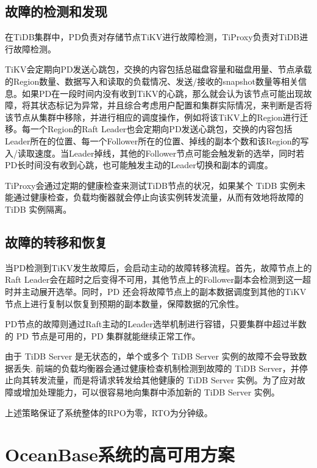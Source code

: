 \subsection{故障的检测和发现}

在TiDB集群中，PD负责对存储节点TiKV进行故障检测，TiProxy负责对TiDB进行故障检测。

TiKV会定期向PD发送心跳包，交换的内容包括总磁盘容量和磁盘用量、节点承载的Region数量、数据写入和读取的负载情况、发送/接收的snapshot数量等相关信息。如果PD在一段时间内没有收到TiKV的心跳，那么就会认为该节点可能出现故障，将其状态标记为异常，并且综合考虑用户配置和集群实际情况，来判断是否将该节点从集群中移除，并进行相应的调度操作，例如将该TiKV上的Region进行迁移。每一个Region的Raft Leader也会定期向PD发送心跳包，交换的内容包括Leader所在的位置、每一个Follower所在的位置、掉线的副本个数和该Region的写入/读取速度。当Leader掉线，其他的Follower节点可能会触发新的选举，同时若PD长时间没有收到心跳，也可能触发主动的Leader切换和副本的调度。


TiProxy会通过定期的健康检查来测试TiDB节点的状况，如果某个 TiDB 实例未能通过健康检查，负载均衡器就会停止向该实例转发流量，从而有效地将故障的 TiDB 实例隔离。



\subsection{故障的转移和恢复}

当PD检测到TiKV发生故障后，会启动主动的故障转移流程。首先，故障节点上的Raft Leader会在超时之后变得不可用，其他节点上的Follower副本会检测到这一超时并主动展开选举。同时，PD 还会将故障节点上的副本数据调度到其他的TiKV节点上进行复制以恢复到预期的副本数量，保障数据的冗余性。

PD节点的故障则通过Raft主动的Leader选举机制进行容错，只要集群中超过半数的 PD 节点是可用的，PD 集群就能继续正常工作。

由于 TiDB Server 是无状态的，单个或多个 TiDB Server 实例的故障不会导致数据丢失. 前端的负载均衡器会通过健康检查机制检测到故障的 TiDB Server，并停止向其转发流量，而是将请求转发给其他健康的 TiDB Server 实例。为了应对故障或增加处理能力，可以很容易地向集群中添加新的 TiDB Server 实例。

上述策略保证了系统整体的RPO为零，RTO为分钟级。


\section{OceanBase系统的高可用方案}

